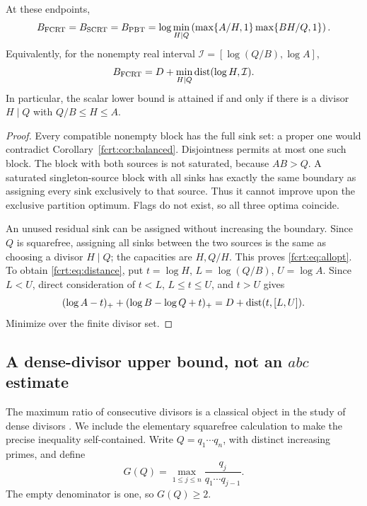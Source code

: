 \begin{theorem}\label{fcrt:thm:reduction}
At these endpoints,
\begin{equation}\label{fcrt:eq:allopt}
 B_{\mathrm{FCRT}}=B_{\mathrm{SCRT}}=B_{\mathrm{PBT}}
 =\log\min_{H\mid Q}\left(\max\{A/H,1\}\max\{BH/Q,1\}\right).
\end{equation}
Equivalently, for the nonempty real interval
\(\mathcal I=[\log(Q/B),\log A]\),
\begin{equation}\label{fcrt:eq:distance}
 B_{\mathrm{FCRT}}=D+\min_{H\mid Q}\operatorname{dist}(\log H,\mathcal I).
\end{equation}
In particular, the scalar lower bound is attained if and only if there is
a divisor \(H\mid Q\) with \(Q/B\le H\le A\).
\end{theorem}
\begin{proof}
Every compatible nonempty block has the full sink set: a proper one would
contradict Corollary~\ref{fcrt:cor:balanced}. Disjointness permits at most one
such block. The block with both sources is not saturated, because \(AB>Q\).
A saturated singleton-source block with all sinks has exactly the same
boundary as assigning every sink exclusively to that source. Thus it cannot
improve upon the exclusive partition optimum. Flags do not exist, so all
three optima coincide.

An unused residual sink can be assigned without increasing the boundary.
Since \(Q\) is squarefree, assigning all sinks between the two sources is
the same as choosing a divisor \(H\mid Q\); the capacities are \(H,Q/H\).
This proves \eqref{fcrt:eq:allopt}. To obtain \eqref{fcrt:eq:distance}, put
\(t=\log H\), \(L=\log(Q/B)\), \(U=\log A\). Since \(L<U\), direct
consideration of \(t<L\), \(L\le t\le U\), and \(t>U\) gives
\[
 (\log A-t)_++(\log B-\log Q+t)_+
       =D+\operatorname{dist}(t,[L,U]).
\]
Minimize over the finite divisor set.
\end{proof}

\subsection{A dense-divisor upper bound, not an \(abc\) estimate}
The maximum ratio of consecutive divisors is a classical object in the
study of dense divisors \cite{fcrt:weingartner}. We include the elementary
squarefree calculation to make the precise inequality self-contained.
Write \(Q=q_1\cdots q_n\), with distinct increasing primes, and define
\[
 G(Q)=\max_{1\le j\le n}\frac{q_j}{q_1\cdots q_{j-1}}.
\]
The empty denominator is one, so \(G(Q)\ge2\).

